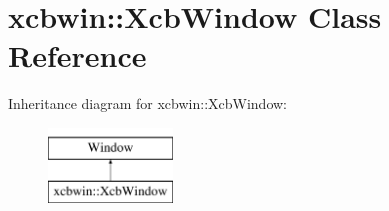 \hypertarget{classxcbwin_1_1XcbWindow}{}\section{xcbwin\+::Xcb\+Window Class Reference}
\label{classxcbwin_1_1XcbWindow}
Inheritance diagram for xcbwin\+::Xcb\+Window\+:\begin{figure}[H]
\begin{center}
\leavevmode
\includegraphics[height=2.000000cm]{classxcbwin_1_1XcbWindow}
\end{center}
\end{figure}
